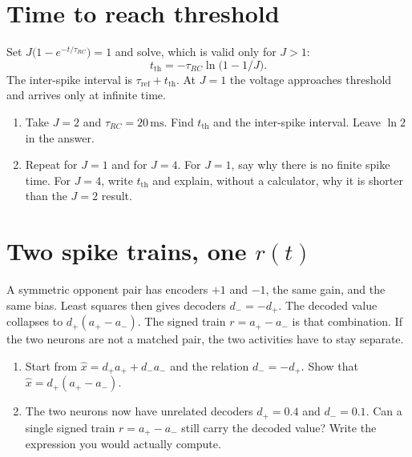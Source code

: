 \documentclass[11pt,letterpaper]{article}
\newcommand{\tref}{\tau_{\mathrm{ref}}}
\newcommand{\trc}{\tau_{RC}}
\begin{document}
\section{Time to reach threshold}

\begin{idea}
Set $J\bigl(1 - e^{-t/\trc}\bigr) = 1$ and solve, which is valid only for $J > 1$:
\[
t_{\mathrm{th}} = -\trc \ln\bigl(1 - 1/J\bigr).
\]
The inter-spike interval is $\tref + t_{\mathrm{th}}$. At $J = 1$ the voltage approaches threshold and arrives only at infinite time.
\end{idea}

\begin{enumerate}
\item Take $J = 2$ and $\trc = 20\,\mathrm{ms}$. Find $t_{\mathrm{th}}$ and the inter-spike interval. Leave $\ln 2$ in the answer.
\item Repeat for $J = 1$ and for $J = 4$. For $J = 1$, say why there is no finite spike time. For $J = 4$, write $t_{\mathrm{th}}$ and explain, without a calculator, why it is shorter than the $J = 2$ result.
\end{enumerate}

\section{Two spike trains, one $r(t)$}

\begin{idea}
A symmetric opponent pair has encoders $+1$ and $-1$, the same gain, and the same bias. Least squares then gives decoders $d_- = -d_+$. The decoded value collapses to $d_+(a_+ - a_-)$. The signed train $r = a_+ - a_-$ is that combination. If the two neurons are not a matched pair, the two activities have to stay separate.
\end{idea}

\begin{enumerate}
\item Start from $\hat{x} = d_+ a_+ + d_- a_-$ and the relation $d_- = -d_+$. Show that $\hat{x} = d_+ (a_+ - a_-)$.
\item The two neurons now have unrelated decoders $d_+ = 0.4$ and $d_- = 0.1$. Can a single signed train $r = a_+ - a_-$ still carry the decoded value? Write the expression you would actually compute.
\end{enumerate}
\end{document}

